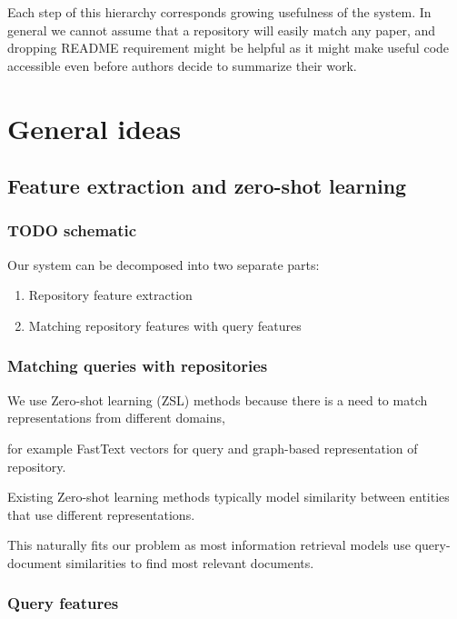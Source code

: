 \documentclass[11pt]{report}
\begin{document}
Each step of this hierarchy corresponds growing usefulness of the system. In
general we cannot assume that a repository will easily match any paper, and
dropping README requirement might be helpful as it might make useful code
accessible even before authors decide to summarize their work. 

\section{General ideas}

\subsection{Feature extraction and zero-shot learning}
\subsubsection{TODO schematic}

Our system can be decomposed into two separate parts:

\begin{enumerate}

\item Repository feature extraction

\item Matching repository features with query features

\end{enumerate}

\subsubsection{Matching queries with repositories}

We use Zero-shot learning (ZSL) methods because there is a need to match representations from different domains,

for example FastText vectors for query and graph-based representation of repository.

Existing Zero-shot learning methods typically model similarity between entities that use different representations.

This naturally fits our problem as most information retrieval models use query-document similarities to find most relevant documents.

\subsubsection{Query features}
\end{document}
